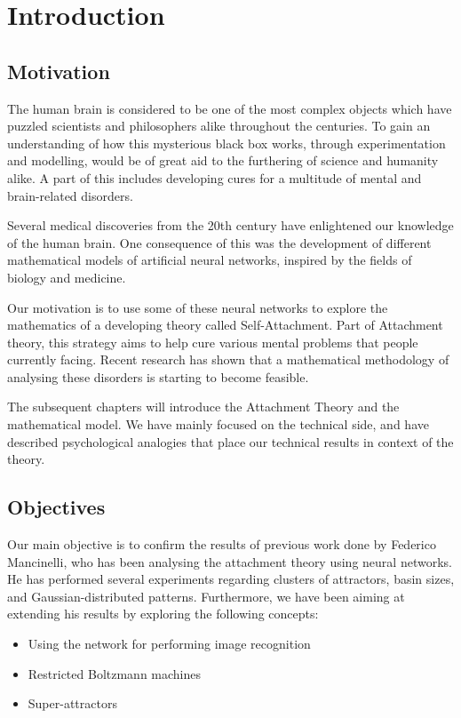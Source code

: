 \chapter{Introduction}

\section{Motivation}

The human brain is considered to be one of the most complex objects which have puzzled scientists and philosophers alike throughout the centuries. To gain an understanding of how this mysterious black box works, through experimentation and modelling, would be of great aid to the furthering of science and humanity alike. A part of this includes developing cures for a multitude of mental and brain-related disorders.

Several medical discoveries from the 20th century have enlightened our knowledge of the human brain. One consequence of this was the development of different mathematical models of artificial neural networks, inspired by the fields of biology and medicine.

Our motivation is to use some of these neural networks to explore the mathematics of a developing theory called Self-Attachment. Part of Attachment theory, this strategy aims to help cure various mental problems that people currently facing. Recent research has shown that a mathematical methodology of analysing these disorders is starting to become feasible. \cite{net_model_neuroses}

The subsequent chapters will introduce the Attachment Theory and the mathematical model. We have mainly focused on the technical side, and have described psychological analogies that place our technical results in context of the theory.

\section{Objectives}

Our main objective is to confirm the results of previous work done by Federico Mancinelli, who has been analysing the attachment theory using neural networks. He has performed several experiments regarding clusters of attractors, basin sizes, and Gaussian-distributed patterns. Furthermore, we have been aiming at extending his results by exploring the following concepts:
\begin{itemize}
\item Using the network for performing image recognition
\item Restricted Boltzmann machines
\item Super-attractors
\end{itemize}

